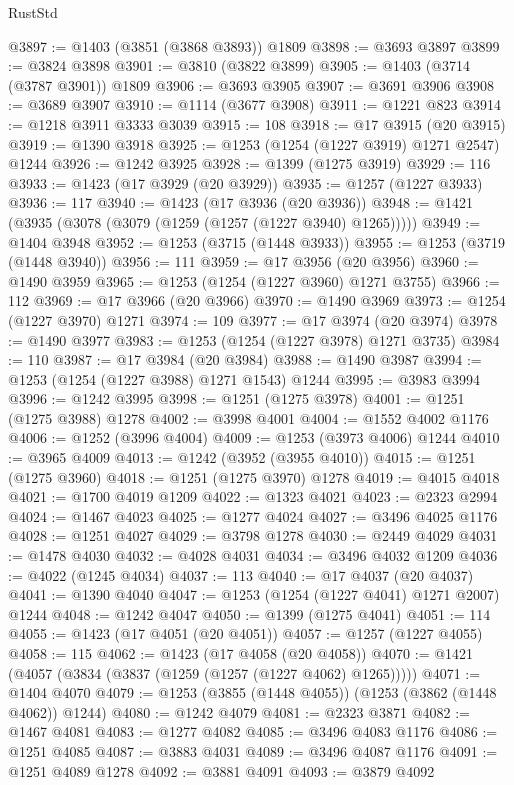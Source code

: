 \begin{lexlean}{RustStd}
\begin{coremodule}
@3897 := @1403 (@3851 (@3868 @3893)) @1809
@3898 := @3693 @3897
@3899 := @3824 @3898
@3901 := @3810 (@3822 @3899)
@3905 := @1403 (@3714 (@3787 @3901)) @1809
@3906 := @3693 @3905
@3907 := @3691 @3906
@3908 := @3689 @3907
@3910 := @1114 (@3677 @3908)
@3911 := @1221 @823
@3914 := @1218 @3911 @3333 @3039
@3915 := 108
@3918 := @17 @3915 (@20 @3915)
@3919 := @1390 @3918
@3925 := @1253 (@1254 (@1227 @3919) @1271 @2547) @1244
@3926 := @1242 @3925
@3928 := @1399 (@1275 @3919)
@3929 := 116
@3933 := @1423 (@17 @3929 (@20 @3929))
@3935 := @1257 (@1227 @3933)
@3936 := 117
@3940 := @1423 (@17 @3936 (@20 @3936))
@3948 := @1421 (@3935 (@3078 (@3079 (@1259 (@1257 (@1227 @3940) @1265)))))
@3949 := @1404 @3948
@3952 := @1253 (@3715 (@1448 @3933))
@3955 := @1253 (@3719 (@1448 @3940))
@3956 := 111
@3959 := @17 @3956 (@20 @3956)
@3960 := @1490 @3959
@3965 := @1253 (@1254 (@1227 @3960) @1271 @3755)
@3966 := 112
@3969 := @17 @3966 (@20 @3966)
@3970 := @1490 @3969
@3973 := @1254 (@1227 @3970) @1271
@3974 := 109
@3977 := @17 @3974 (@20 @3974)
@3978 := @1490 @3977
@3983 := @1253 (@1254 (@1227 @3978) @1271 @3735)
@3984 := 110
@3987 := @17 @3984 (@20 @3984)
@3988 := @1490 @3987
@3994 := @1253 (@1254 (@1227 @3988) @1271 @1543) @1244
@3995 := @3983 @3994
@3996 := @1242 @3995
@3998 := @1251 (@1275 @3978)
@4001 := @1251 (@1275 @3988) @1278
@4002 := @3998 @4001
@4004 := @1552 @4002 @1176
@4006 := @1252 (@3996 @4004)
@4009 := @1253 (@3973 @4006) @1244
@4010 := @3965 @4009
@4013 := @1242 (@3952 (@3955 @4010))
@4015 := @1251 (@1275 @3960)
@4018 := @1251 (@1275 @3970) @1278
@4019 := @4015 @4018
@4021 := @1700 @4019 @1209
@4022 := @1323 @4021
@4023 := @2323 @2994
@4024 := @1467 @4023
@4025 := @1277 @4024
@4027 := @3496 @4025 @1176
@4028 := @1251 @4027
@4029 := @3798 @1278
@4030 := @2449 @4029
@4031 := @1478 @4030
@4032 := @4028 @4031
@4034 := @3496 @4032 @1209
@4036 := @4022 (@1245 @4034)
@4037 := 113
@4040 := @17 @4037 (@20 @4037)
@4041 := @1390 @4040
@4047 := @1253 (@1254 (@1227 @4041) @1271 @2007) @1244
@4048 := @1242 @4047
@4050 := @1399 (@1275 @4041)
@4051 := 114
@4055 := @1423 (@17 @4051 (@20 @4051))
@4057 := @1257 (@1227 @4055)
@4058 := 115
@4062 := @1423 (@17 @4058 (@20 @4058))
@4070 := @1421 (@4057 (@3834 (@3837 (@1259 (@1257 (@1227 @4062) @1265)))))
@4071 := @1404 @4070
@4079 := @1253 (@3855 (@1448 @4055)) (@1253 (@3862 (@1448 @4062)) @1244)
@4080 := @1242 @4079
@4081 := @2323 @3871
@4082 := @1467 @4081
@4083 := @1277 @4082
@4085 := @3496 @4083 @1176
@4086 := @1251 @4085
@4087 := @3883 @4031
@4089 := @3496 @4087 @1176
@4091 := @1251 @4089 @1278
@4092 := @3881 @4091
@4093 := @3879 @4092

\end{coremodule}
\end{lexlean}
